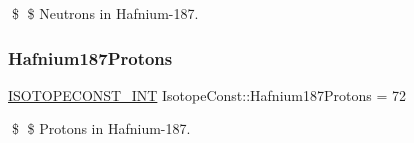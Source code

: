 \$ \$ Neutrons in Hafnium-\/187. \mbox{\label{group___isotope_const-_hafnium-_hf187_ga95faa33f56f7c4ccec179c1dfd275da8}} 
\subsubsection{\texorpdfstring{Hafnium187\+Protons}{Hafnium187Protons}}
{\footnotesize\ttfamily \mbox{\hyperlink{group___isotope_const-_macros_ga5f18360b3e99483a35c32d789e62621c}{I\+S\+O\+T\+O\+P\+E\+C\+O\+N\+S\+T\+\_\+\+I\+NT}} Isotope\+Const\+::\+Hafnium187\+Protons = 72}

\$ \$ Protons in Hafnium-\/187. 
